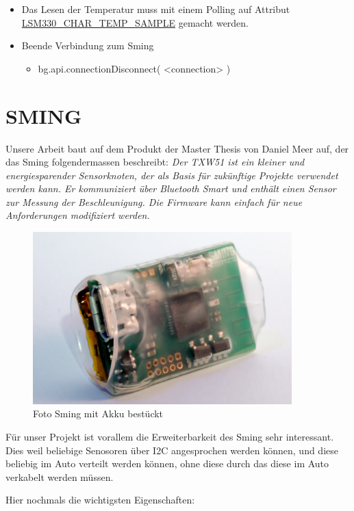 \begin{itemize}
\begin{itemize}
	\item Das Lesen der Temperatur muss mit einem Polling auf Attribut \url{LSM330_CHAR_TEMP_SAMPLE} gemacht werden.

	\item Beende Verbindung zum Sming
			\begin{itemize}
				\itemsep 1pt \parskip 0pt \parsep 0pt
				\item bg.api.connectionDisconnect( <connection> )
			\end{itemize}
	\end{itemize}
\end{itemize}


\section{SMING}\label{sec:sming}
Unsere Arbeit baut auf dem Produkt der Master Thesis von Daniel Meer auf, der das Sming folgendermassen beschreibt: \textit{Der TXW51 ist ein kleiner und energiesparender Sensorknoten, der als Basis für zukünftige Projekte verwendet werden kann. Er kommuniziert über Bluetooth Smart und enthält einen Sensor zur Messung der Beschleunigung. Die Firmware kann einfach für neue Anforderungen modifiziert werden.}\cite{meer:masterthesis}

\begin{figure}[hbtp]
	\center
	\includegraphics[width=10cm]{bilder/foto-6.jpg}
	\caption{Foto Sming mit Akku bestückt}
	\label{fig:sming}
\end{figure}

Für unser Projekt ist vorallem die Erweiterbarkeit des Sming sehr interessant. Dies weil beliebige Senosoren über I2C angesprochen werden können, und diese beliebig im Auto verteilt werden können, ohne diese durch das diese im Auto verkabelt werden müssen.

Hier nochmals die wichtigsten Eigenschaften:

